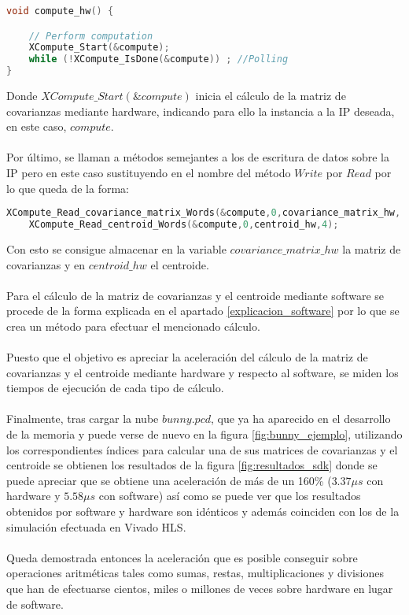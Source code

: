 \begin{lstlisting}[language=C++,breaklines]
	void compute_hw() {

	// Perform computation
	XCompute_Start(&compute);
	while (!XCompute_IsDone(&compute)) ; //Polling
}
\end{lstlisting}

Donde $XCompute\_Start(\&compute)$ inicia el cálculo de la matriz de covarianzas mediante hardware, indicando para ello la instancia a la IP deseada, en este caso, $compute$.
\\
\\
Por último, se llaman a métodos semejantes a los de escritura de datos sobre la IP pero en este caso sustituyendo en el nombre del método $Write$ por $Read$ por lo que queda de la forma:

\begin{lstlisting}[language=C++,breaklines]
	XCompute_Read_covariance_matrix_Words(&compute,0,covariance_matrix_hw, 9);
	XCompute_Read_centroid_Words(&compute,0,centroid_hw,4);

\end{lstlisting}

Con esto se consigue almacenar en la variable $covariance\_matrix\_hw$ la matriz de covarianzas y en $centroid\_hw$ el centroide.
\\
\\
Para el cálculo de la matriz de covarianzas y el centroide mediante software se procede de la forma explicada en el apartado \ref{explicacion_software} por lo que se crea un método para efectuar el mencionado cálculo.
\\
\\
Puesto que el objetivo es apreciar la aceleración del cálculo de la matriz de covarianzas y el centroide mediante hardware y respecto al software, se miden los tiempos de ejecución de cada tipo de cálculo.
\\
\\
Finalmente, tras cargar la nube $bunny.pcd$, que ya ha aparecido en el desarrollo de la memoria y puede verse de nuevo en la figura \ref{fig:bunny_ejemplo}, utilizando los correspondientes índices para calcular una de sus matrices de covarianzas y el centroide se obtienen los resultados de la figura \ref{fig:resultados_sdk} donde se puede apreciar que se obtiene una aceleración de más de un 160\% ($3.37\mu s$ con hardware y $5.58\mu s$ con software) así como se puede ver que los resultados obtenidos por software y hardware son idénticos y además coinciden con los de la simulación efectuada en Vivado HLS.
\\
\\
Queda demostrada entonces la aceleración que es posible conseguir sobre operaciones aritméticas tales como sumas, restas, multiplicaciones y divisiones que han de efectuarse cientos, miles o millones de veces sobre hardware en lugar de software.

